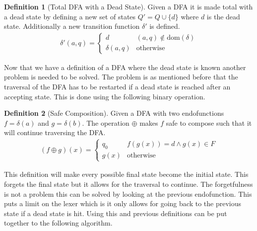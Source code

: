 \documentclass[a4paper,12pt]{article}
\theoremstyle{definition}
\newtheorem{definition}{Definition}[section]
\begin{document}
\begin{definition}[Total DFA with a Dead State]
  Given a DFA it is made total with a dead state by defining a new set of states $Q' = Q \cup \{d\}$ where $d$ is the dead state. Additionally a new transition function $\delta'$ is defined.
  \begin{align*}
    \delta'(a, q) = \begin{cases}
      d &  (a, q) \notin \text{dom}(\delta) \\
      \delta(a, q) & \text{otherwise}
    \end{cases}
  \end{align*}
\end{definition}
\noindent Now that we have a definition of a DFA where the dead state is known another problem is needed to be solved. The problem is as mentioned before that the traversal of the DFA has to be restarted if a dead state is reached after an accepting state. This is done using the following binary operation.

\begin{definition}[Safe Composition]
  Given a DFA with two endofunctions $f = \delta(a)$ and $g = \delta(b)$. The operation $\oplus$ makes $f$ safe to compose such that it will continue traversing the DFA.
  \begin{align*}
    (f \oplus g)(x) =
    \begin{cases}
      q_0 & f(g(x)) = d \land g(x) \in F \\
      g(x) & \text{otherwise} 
    \end{cases}
  \end{align*}
\end{definition}
\noindent This definition will make every possible final state become the initial state. This forgets the final state but it allows for the traversal to continue. The forgetfulness is not a problem this can be solved by looking at the previous endofunction. This puts a limit on the lexer which is it only allows for going back to the previous state if a dead state is hit.
Using this and previous definitions can be put together to the following algorithm.
\end{document}
